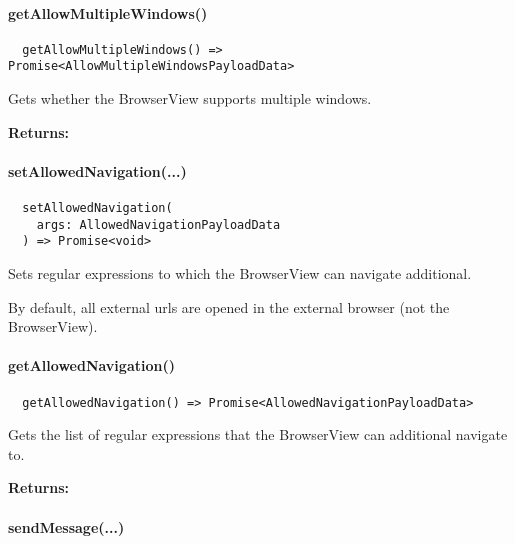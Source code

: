 

\paragraph{getAllowMultipleWindows()}

\begin{verbatim}
  getAllowMultipleWindows() => Promise<AllowMultipleWindowsPayloadData>
\end{verbatim}

Gets whether the BrowserView supports multiple windows.

\textbf{Returns:} 



\paragraph{setAllowedNavigation(...)}

\begin{verbatim}
  setAllowedNavigation(
    args: AllowedNavigationPayloadData
  ) => Promise<void>
\end{verbatim}

Sets regular expressions to which the BrowserView can navigate additional.

By default, all external \acp{url} are opened in the external browser (not the BrowserView).



\paragraph{getAllowedNavigation()}

\begin{verbatim}
  getAllowedNavigation() => Promise<AllowedNavigationPayloadData>
\end{verbatim}

Gets the list of regular expressions that the BrowserView can additional navigate to.

\textbf{Returns:} 


\newpage

\paragraph{sendMessage(...)}

